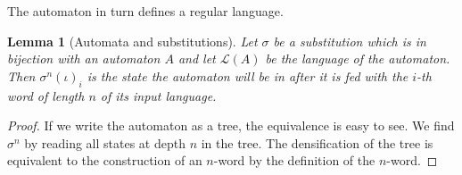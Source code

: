 \documentclass{article}
\newtheorem{lemma}[theorem]{Lemma}
\theoremstyle{definition}
\begin{document}
The automaton in turn defines a regular language.
\begin{lemma}[Automata and substitutions] \label{lem:automata_substitutions}
Let $\sigma$ be a substitution which is in bijection with an automaton $A$ and
let $\mathcal{L}(A)$ be the language of the automaton. Then $\sigma^n(\iota)_i$
is the state the automaton will be in after it is fed with the $i$-th word 
of length $n$ of its input language.
\end{lemma}

\begin{proof}
If we write the automaton as a tree, the equivalence is easy to see. We find 
$\sigma^n$ by reading all states at depth $n$ in the tree. The densification 
of the tree is equivalent to the construction of an $n$-word by the definition
of the $n$-word.
\end{proof}
\end{document}
